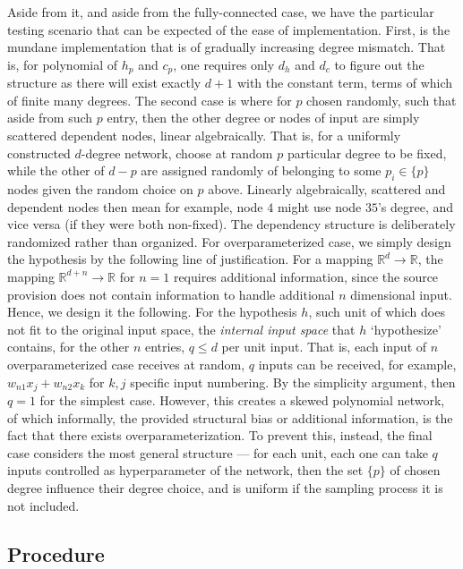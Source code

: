 Aside from it, and aside from the fully-connected case, we have the particular testing scenario that can be expected of the ease of implementation. First, is the mundane implementation that is of gradually increasing degree mismatch. That is, for polynomial of $h_{p}$ and $c_{p}$, one requires only $d_{h}$ and $d_{c}$ to figure out the structure as there will exist exactly $d+1$ with the constant term, terms of which of finite many degrees. The second case is where for $p$ chosen randomly, such that aside from such $p$ entry, then the other degree or nodes of input are simply scattered dependent nodes, linear algebraically. That is, for a uniformly constructed $d$-degree network, choose at random $p$ particular degree to be fixed, while the other of $d-p$ are assigned randomly of belonging to some $p_{i}\in \{p\}$ nodes given the random choice on $p$ above. Linearly algebraically, scattered and dependent nodes then mean for example, node $4$ might use node $35$'s degree, and vice versa (if they were both non-fixed). The dependency structure is deliberately randomized rather than organized. For overparameterized case, we simply design the hypothesis by the following line of justification. For a mapping $\mathbb{R}^{d}\to\mathbb{R}$, the mapping $\mathbb{R}^{d+n}\to \mathbb{R}$ for $n= 1$ requires additional information, since the source provision does not contain information to handle additional $n$ dimensional input. Hence, we design it the following. For the hypothesis $h$, such unit of which does not fit to the original input space, the \textit{internal input space} that $h$ `hypothesize' contains, for the other $n$ entries, $q\leq d$ per unit input. That is, each input of $n$ overparameterized case receives at random, $q$ inputs can be received, for example, $w_{n1}x_{j}+w_{n2}x_{k}$ for $k,j$ specific input numbering. By the simplicity argument, then $q=1$ for the simplest case. However, this creates a skewed polynomial network, of which informally, the provided structural bias or additional information, is the fact that there exists overparameterization. To prevent this, instead, the final case considers the most general structure --- for each unit, each one can take $q$ inputs controlled as hyperparameter of the network, then the set $\{p\}$ of chosen degree influence their degree choice, and is uniform if the sampling process it is not included. 

\subsection{Procedure}


